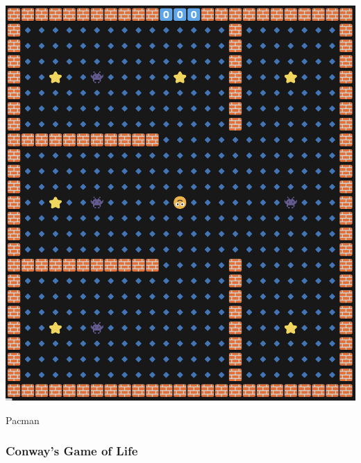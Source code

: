 \documentclass{article}
\begin{document}
\begin{multicols}{2}
\begin{minipage}{\linewidth}
    \centering
    \includegraphics[width=0.8\linewidth]{pacman.png}
    \captionsetup{type=figure}
    \caption{Pacman}
    \label{fig:enter-label}
\end{minipage}

\end{multicols}


\subsubsection{Conway's Game of Life}
\end{document}
